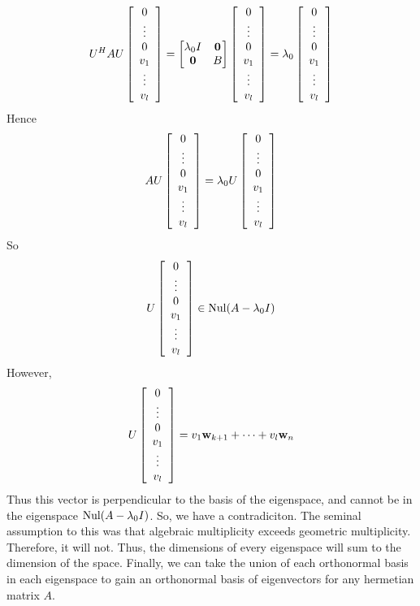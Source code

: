 \documentclass{article}
\begin{document}
    \[U^H AU \left[\begin{array}{c}0 \\ \vdots \\ 0 \\ v_1 \\ \vdots \\ v_l\end{array}\right] = \begin{bmatrix}
        \lambda_0 I & \mathbf{0} \\
        \mathbf{0} & B
    \end{bmatrix}\left[\begin{array}{c}0 \\ \vdots \\ 0 \\ v_1 \\ \vdots \\ v_l\end{array}\right] = \lambda_0 \left[\begin{array}{c}0 \\ \vdots \\ 0 \\ v_1 \\ \vdots \\ v_l\end{array}\right]\]
    Hence
    \[AU\left[\begin{array}{c}0 \\ \vdots \\ 0 \\ v_1 \\ \vdots \\ v_l\end{array}\right] = \lambda_0 U \left[\begin{array}{c}0 \\ \vdots \\ 0 \\ v_1 \\ \vdots \\ v_l\end{array}\right]\]
    So 
    \[U \left[\begin{array}{c}0 \\ \vdots \\ 0 \\ v_1 \\ \vdots \\ v_l\end{array}\right] \in \operatorname{Nul}(A - \lambda_0 I)\]
    However, 
    \[U\left[\begin{array}{c}0 \\ \vdots \\ 0 \\ v_1 \\ \vdots \\ v_l\end{array}\right] = v_1\mathbf{w}_{k+1} + \cdots + v_l\mathbf{w}_{n}\]
    Thus this vector is perpendicular to the basis of the eigenspace, and cannot be in the eigenspace $\operatorname{Nul}(A - \lambda_0 I)$. So, we have a contradiciton. The seminal assumption to this was that algebraic multiplicity exceeds geometric multiplicity. Therefore, it will not. Thus, the dimensions of every eigenspace will sum to the dimension of the space. Finally, we can take the union of each orthonormal basis in each eigenspace to gain an orthonormal basis of eigenvectors for any hermetian matrix $A$.
\end{document}
